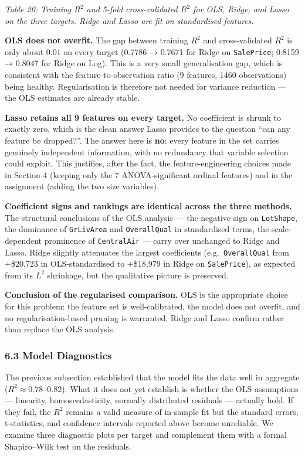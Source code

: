 \emph{Table 20: Training \(R^2\) and 5-fold cross-validated \(R^2\) for
OLS, Ridge, and Lasso on the three targets. Ridge and Lasso are fit on
standardised features.}

\textbf{OLS does not overfit.} The gap between training \(R^2\) and
cross-validated \(R^2\) is only about 0.01 on every target (0.7786 →
0.7671 for Ridge on \texttt{SalePrice}; 0.8159 → 0.8047 for Ridge on
Log). This is a very small generalisation gap, which is consistent with
the feature-to-observation ratio (9 features, 1460 observations) being
healthy. Regularisation is therefore not needed for variance reduction
--- the OLS estimates are already stable.

\textbf{Lasso retains all 9 features on every target.} No coefficient is
shrunk to exactly zero, which is the clean answer Lasso provides to the
question ``can any feature be dropped?''. The answer here is
\textbf{no}: every feature in the set carries genuinely independent
information, with no redundancy that variable selection could exploit.
This justifies, after the fact, the feature-engineering choices made in
Section 4 (keeping only the 7 ANOVA-significant ordinal features) and in
the assignment (adding the two size variables).

\textbf{Coefficient signs and rankings are identical across the three
methods.} The structural conclusions of the OLS analysis --- the
negative sign on \texttt{LotShape}, the dominance of \texttt{GrLivArea}
and \texttt{OverallQual} in standardised terms, the scale-dependent
prominence of \texttt{CentralAir} --- carry over unchanged to Ridge and
Lasso. Ridge slightly attenuates the largest coefficients
(e.g.~\texttt{OverallQual} from +\$20,723 in OLS-standardised to
+\$18,979 in Ridge on \texttt{SalePrice}), as expected from its \(L^2\)
shrinkage, but the qualitative picture is preserved.

\textbf{Conclusion of the regularised comparison.} OLS is the
appropriate choice for this problem: the feature set is well-calibrated,
the model does not overfit, and no regularisation-based pruning is
warranted. Ridge and Lasso confirm rather than replace the OLS analysis.

\subsubsection{6.3 Model Diagnostics}\label{model-diagnostics}

The previous subsection established that the model fits the data well in
aggregate (\(R^2 \approx 0.78\)--\(0.82\)). What it does not yet
establish is whether the OLS assumptions --- linearity,
homoscedasticity, normally distributed residuals --- actually hold. If
they fail, the \(R^2\) remains a valid measure of in-sample fit but the
standard errors, t-statistics, and confidence intervals reported above
become unreliable. We examine three diagnostic plots per target and
complement them with a formal Shapiro--Wilk test on the residuals.

